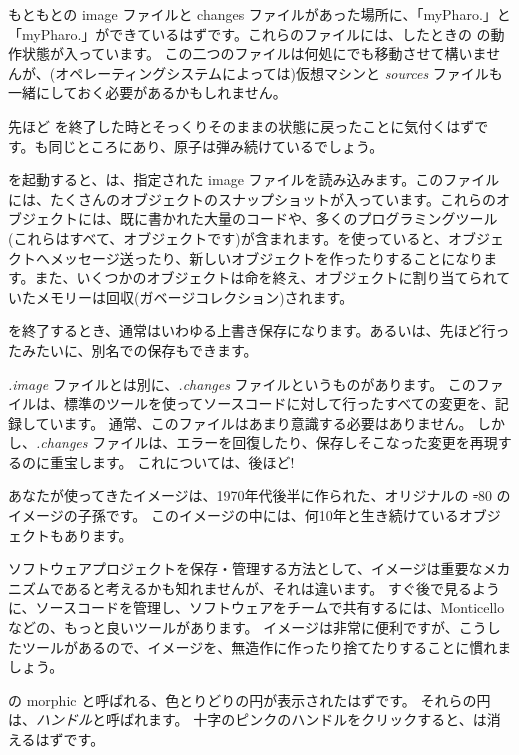 \documentclass[a4paper,10pt,twoside]{book}
\begin{document}
もともとの image ファイルと changes ファイルがあった場所に、「myPharo.」と「myPharo.」ができているはずです。これらのファイルには、したときの \pharo の動作状態が入っています。
この二つのファイルは何処にでも移動させて構いませんが、(オペレーティングシステムによっては)仮想マシンと \emph{sources} ファイルも一緒にしておく必要があるかもしれません。


先ほど \pharo を終了した時とそっくりそのままの状態に戻ったことに気付くはずです。\bam も同じところにあり、原子は弾み続けているでしょう。

\pharo を起動すると、\pharo {}は、指定された image ファイルを読み込みます。このファイルには、たくさんのオブジェクトのスナップショットが入っています。これらのオブジェクトには、既に書かれた大量のコードや、多くのプログラミングツール(これらはすべて、オブジェクトです)が含まれます。\pharo を使っていると、オブジェクトへメッセージ送ったり、新しいオブジェクトを作ったりすることになります。また、いくつかのオブジェクトは命を終え、オブジェクトに割り当てられていたメモリーは回収(\ie ガベージコレクション)されます。

\pharo を終了するとき、通常はいわゆる上書き保存になります。あるいは、先ほど行ったみたいに、別名での保存もできます。

\emph{.image} ファイルとは別に、\emph{.changes} ファイルというものがあります。
このファイルは、標準のツールを使ってソースコードに対して行ったすべての変更を、記録しています。
通常、このファイルはあまり意識する必要はありません。
しかし、\emph{.changes} ファイルは、エラーを回復したり、保存しそこなった変更を再現するのに重宝します。
これについては、後ほど!

あなたが使ってきたイメージは、1970年代後半に作られた、オリジナルの \st-80 のイメージの子孫です。
このイメージの中には、何10年と生き続けているオブジェクトもあります。

ソフトウェアプロジェクトを保存・管理する方法として、イメージは重要なメカニズムであると考えるかも知れませんが、それは違います。
すぐ後で見るように、ソースコードを管理し、ソフトウェアをチームで共有するには、Monticello などの、もっと良いツールがあります。
イメージは非常に便利ですが、こうしたツールがあるので、イメージを、無造作に作ったり捨てたりすることに慣れましょう。

\bam の morphic  と呼ばれる、色とりどりの円が表示されたはずです。
それらの円は、\emph{ハンドル}と呼ばれます。
十字のピンクのハンドルをクリックすると、\bam は消えるはずです。
\end{document}
